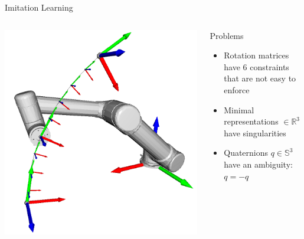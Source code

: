 \documentclass[14pt]{beamer}
\begin{document}
\begin{frame}[fragile]{Imitation Learning}
\begin{columns}
\begin{column}{0.3\textwidth}
\includegraphics[width=\textwidth]{images/movement_primitives_cart_dmp_ur5}
\end{column}
\begin{column}{0.7\textwidth}
Problems
\begin{itemize}
\item Rotation matrices have 6 constraints that are not easy to enforce
\item Minimal representations $\in \mathbb{R}^3$ have singularities
\item Quaternions $q \in \mathbb{S}^3$ have an ambiguity: $q = -q$
\end{itemize}
\end{column}
\end{columns}
\end{frame}
\end{document}
